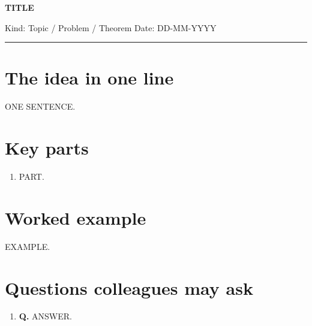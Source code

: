 \documentclass[11pt,a4paper]{article}
\begin{document}
{\LARGE\bfseries\color{accent} TITLE}\par
\vspace{2pt}
{\small Kind: Topic / Problem / Theorem \quad Date: DD-MM-YYYY}
\vspace{6pt}\hrule\vspace{6pt}

\section{The idea in one line}
ONE SENTENCE.

\section{Key parts}
\begin{enumerate}
  \item PART.
\end{enumerate}

\section{Worked example}
EXAMPLE.


\section{Questions colleagues may ask}
\begin{enumerate}
  \item \textbf{Q.} ANSWER.
\end{enumerate}
\end{document}
